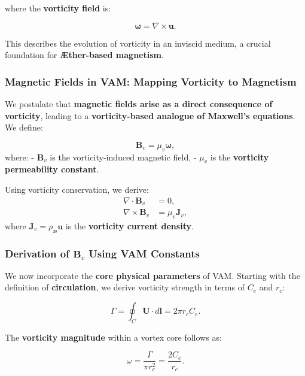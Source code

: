     where the \textbf{vorticity field} is:

    \begin{equation*}
        \boldsymbol{\omega} = \nabla \times \boldsymbol{u}.
    \end{equation*}

    This describes the evolution of vorticity in an inviscid medium, a crucial foundation for \textbf{Æther-based magnetism}.

    \subsubsection*{Magnetic Fields in VAM: Mapping Vorticity to Magnetism}
    We postulate that \textbf{magnetic fields arise as a direct consequence of vorticity}, leading to a \textbf{vorticity-based analogue of Maxwell’s equations}. We define:

    \begin{equation*}
        \boldsymbol{B}_v = \mu_v \boldsymbol{\omega},
    \end{equation*}
    where:
    - \( \boldsymbol{B}_v \) is the vorticity-induced magnetic field,
    - \( \mu_v \) is the \textbf{vorticity permeability constant}.

    Using vorticity conservation, we derive:
    \begin{align}
        \nabla \cdot \boldsymbol{B}_v &= 0, \\
        \nabla \times \boldsymbol{B}_v &= \mu_v \boldsymbol{J}_v,
    \end{align}
    where \( \boldsymbol{J}_v = \rho_\text{\ae} \boldsymbol{u} \) is the \textbf{vorticity current density}.

    \subsubsection*{Derivation of \( \boldsymbol{B}_v \) Using VAM Constants}
    We now incorporate the \textbf{core physical parameters} of VAM. Starting with the definition of \textbf{circulation}, we derive vorticity strength in terms of \( C_e \) and \( r_c \):

    \begin{equation*}
        \Gamma = \oint_C \mathbf{U} \cdot d\mathbf{l} = 2\pi r_c C_e.
    \end{equation*}

    The \textbf{vorticity magnitude} within a vortex core follows as:

    \begin{equation*}
        \omega = \frac{\Gamma}{\pi r_c^2} = \frac{2 C_e}{r_c}.
    \end{equation*}

